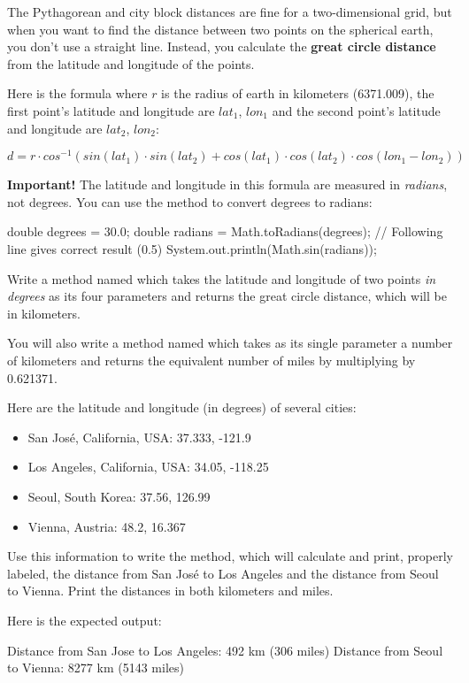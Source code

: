 \begin{exercise}
The Pythagorean and city block distances are fine for a two-dimensional grid, but when you want to find the distance between two points on the spherical earth, you don't use a straight line. Instead, you calculate the {\bf great circle distance} from the latitude and longitude of the points.

Here is the formula where $r$ is the radius of earth in kilometers (6371.009), the first point's latitude and longitude are $lat_1$, $lon_1$ and the second point's latitude and longitude are  $lat_2$, $lon_2$:

\begin{equation*}
d = r\cdot cos^{-1}(sin(lat_1)\cdot sin(lat_2) + cos(lat_1)\cdot cos(lat_2)\cdot cos(lon_1 - lon_2))
\end{equation*}

{\bf Important!} The latitude and longitude in this formula are measured in {\em radians}, not degrees. You can use the  method to convert degrees to radians:

\begin{code}
double degrees = 30.0;
double radians = Math.toRadians(degrees);
// Following line gives correct result (0.5)
System.out.println(Math.sin(radians));
\end{code}

Write a method named  which takes the latitude and longitude of two points {\em in degrees} as its four parameters and returns the great circle distance, which will be in kilometers.

You will also write a method named  which takes as its single parameter a number of kilometers and returns the equivalent number of miles by multiplying by 0.621371.

Here are the latitude and longitude (in degrees) of several cities:
\begin{itemize}
\item San Jos\'e, California, USA: 37.333, -121.9
\item Los Angeles, California, USA: 34.05, -118.25
\item Seoul, South Korea: 37.56, 126.99
\item Vienna, Austria: 48.2, 16.367
\end{itemize}

Use this information to write the  method, which will calculate and print, properly labeled, the distance from San Jos\'e to Los Angeles and the distance from Seoul to Vienna. Print the distances in both kilometers and miles.

Here is the expected output:

\begin{stdout}
Distance from San Jose to Los Angeles: 492 km (306 miles)
Distance from Seoul to Vienna: 8277 km (5143 miles)
\end{stdout}

\end{exercise}

